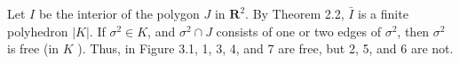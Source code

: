 Let $I$ be the interior of the polygon $J$ in $\mathbf{R}^{2}$. By Theorem 2.2, $\bar{I}$ is a finite polyhedron $|K|$. If $\sigma^{2} \in K$, and $\sigma^{2} \cap J$ consists of one or two edges of $\sigma^{2}$, then $\sigma^{2}$ is free (in $K$ ). Thus, in Figure 3.1, 1, 3, 4, and 7 are free, but 2, 5, and 6 are not.

\begin{center}
\end{center}

